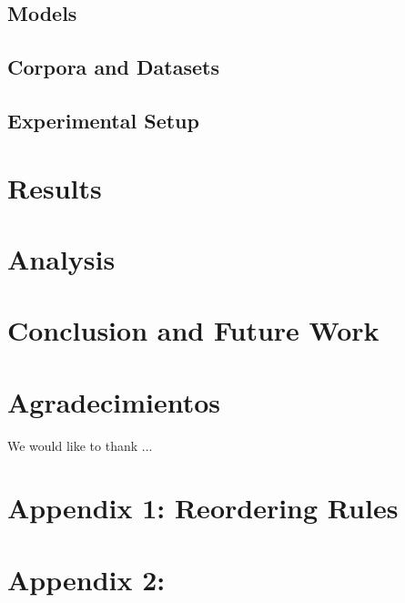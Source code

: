 \documentclass[a4paper,11pt,twocolumn,twoside]{article}
\begin{document}
\subsection{Models}

\subsection{Corpora and Datasets}

\subsection{Experimental Setup}

\section{Results}

\section{Analysis}

\section{Conclusion and Future Work}


\section*{Agradecimientos}

We would like to thank ...





\appendix
\section{Appendix 1: Reordering Rules} 



\section{Appendix 2: } 
\end{document}
